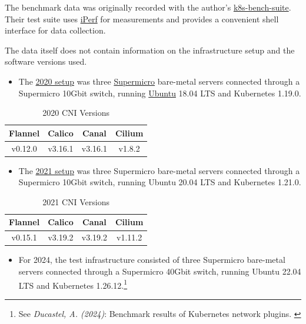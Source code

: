 The benchmark data was originally recorded with the author's \href{https://github.com/InfraBuilder/k8s-bench-suite}{k8s-bench-suite}. Their test suite uses \href{https://iperf.fr/}{iPerf} for measurements and provides a convenient shell interface for data collection.

The data itself does not contain information on the infrastructure setup and the software versions used.

\begin{itemize}
    \item The \href{https://github.com/InfraBuilder/benchmark-k8s-cni-2020-08/blob/master/PROTOCOL.md}{2020 setup} was three \href{https://www.supermicro.com/en/}{Supermicro} bare-metal servers connected through a Supermicro 10Gbit switch, running \href{https://ubuntu.com/server}{Ubuntu} 18.04 LTS and Kubernetes 1.19.0.
\end{itemize}

\begin{table}[H]
\caption{2020 CNI Versions}
\begin{tabular}{|c | c | c | c |} 
 \hline
 Flannel & Calico & Canal & Cilium \\
 \hline
 v0.12.0 & v3.16.1 & v3.16.1 & v1.8.2 \\ 
 \hline
\end{tabular}
\label{tab:2020ver}
\end{table}

\begin{itemize}
    \item The \href{https://github.com/InfraBuilder/benchmark-k8s-cni-2021-05/blob/main/PROTOCOL.md}{2021 setup} was three Supermicro bare-metal servers connected through a Supermicro 10Gbit switch, running Ubuntu 20.04 LTS and Kubernetes 1.21.0.
\end{itemize}

\begin{table}[H]
\caption{2021 CNI Versions}
\begin{tabular}{|c | c | c | c |} 
 \hline
 Flannel & Calico & Canal & Cilium \\
 \hline
 v0.15.1 & v3.19.2 & v3.19.2 & v1.11.2 \\ 
 \hline
\end{tabular}
\label{tab:2021ver}
\end{table}

\begin{itemize}
    \item For 2024, the test infrastructure consisted of three Supermicro bare-metal servers connected through a Supermicro 40Gbit switch, running Ubuntu 22.04 LTS and Kubernetes 1.26.12.\footnote{See \textit{Ducastel, A. (2024)}: Benchmark results of Kubernetes network plugins. \cite{originalArticle}}
\end{itemize}

